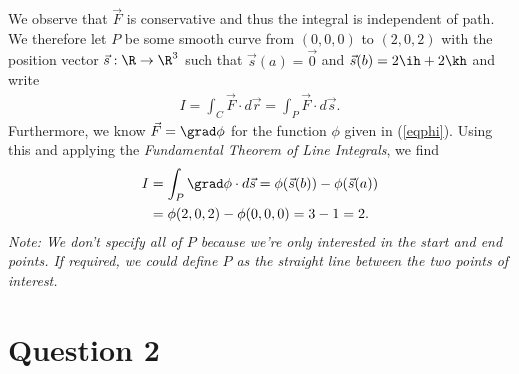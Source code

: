 \documentclass{article}
\begin{document}
We observe that $\vec F$ is conservative and thus the integral is independent of
path. We therefore let $P$ be some smooth curve from $(0,0,0)$ to $(2,0,2)$ with the
position vector $\vec s:\R\to\R^3$ such that $\vec s(a)=\vec 0$ and $\vec s(b)=2\ih + 2\kh$
and write
\begin{align*}
	I=\int_C \vec F \cdot d\vec r = \int_P \vec F \cdot d\vec s.
\end{align*}
Furthermore, we know $\vec F=\grad\phi$ for the function $\phi$ given in (\ref{eqphi}).
Using this and applying the \emph{Fundamental Theorem of Line Integrals}, we find
\begin{align*}
	I & = \int_P \grad \phi\cdot d\vec s = \phi(\vec s(b))-\phi(\vec s(a)) \\
	  & = \phi(2,0,2)-\phi(0,0,0) = 3 - 1 = 2.
\end{align*}
\emph{Note: We don't specify all of $P$ because we're only interested in the start
	and end points. If required, we could define $P$ as the straight line between
	the two points of interest.}


\section*{Question 2}
\end{document}
